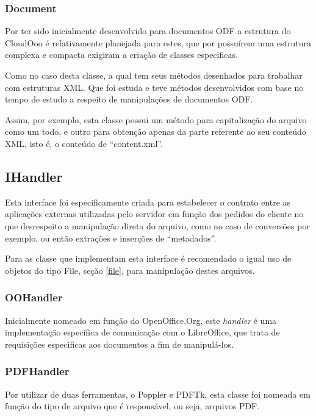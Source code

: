 \subsubsection{Document}

Por ter sido inicialmente desenvolvido para documentos ODF a estrutura do CloudOoo é relativamente planejada para estes, que por possuírem uma estrutura complexa e compacta exigiram a criação de classes especificas. 

Como no caso desta classe, a qual tem seus métodos desenhados para trabalhar com estruturas XML. Que foi estuda e teve métodos desenvolvidos com base no tempo de estudo a respeito de manipulações de documentos ODF.

Assim, por exemplo, esta classe possui um método para capitalização do arquivo como um todo, e outro para obtenção apenas da parte referente ao seu conteúdo XML, isto é, o conteúdo de ``content.xml''.


\subsection{IHandler}
\label{ihandler}

Esta interface foi especificamente criada para estabelecer o contrato entre as aplicações externas utilizadas pelo servidor em função dos pedidos do cliente no que desrespeito a manipulação direta do arquivo, como no caso de conversões por exemplo, ou então extrações e inserções de ``metadados''.

Para as classe que implementam esta interface é recomendado o igual uso de objetos do tipo File, seção \ref{file}, para manipulação destes arquivos.


\subsubsection{OOHandler}

Inicialmente nomeado em função do OpenOffice.Org, este \textit{handler} é uma implementação específica de comunicação com o LibreOffice, que trata de requisições especificas aos documentos a fim de manipulá-los.


\subsubsection{PDFHandler}

Por utilizar de duas ferramentas, o Poppler e PDFTk, esta classe foi nomeada em função do tipo de arquivo que é responsável, ou seja, arquivos PDF. 


